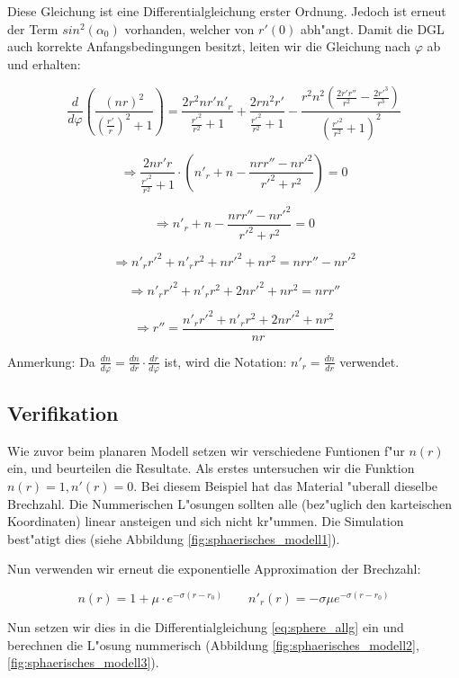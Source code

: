 \begin{refsection}
Diese Gleichung ist eine Differentialgleichung erster Ordnung. 
Jedoch ist erneut der Term $sin^2(\alpha_0)$ vorhanden, welcher von $r'(0)$ abh"angt. 
Damit die DGL auch korrekte Anfangsbedingungen besitzt, leiten wir die Gleichung nach $\varphi$ ab und erhalten:

$$\frac{d}{d\varphi}\left(\frac{(n r)^2}{\left(\frac{r'}{r}\right)^2 + 1}\right) =  \frac{2 r^2 n r' n'_r}{\frac{r'^2}{r^2}+1}+\frac{2 r n^2 r'}{\frac{r'^2}{r^2}+1}-\frac{r^2 n^2 \left(\frac{2 r' r''}{r^2}-\frac{2 r'^3}{r^3}\right)}{\left(\frac{r'^2}{r^2}+1\right)^2}$$

$$\Rightarrow \frac{2n r' r}{\frac{r'^2}{r^2}+1} \cdot \left( n'_r + n - \frac{n r r'' - n r'^2}{r'^2 + r^2} \right) = 0$$

\begin{equation} \label{eq:sphere_origin}
\Rightarrow n'_r + n - \frac{n r r'' - n r'^2}{r'^2 + r^2} = 0
\end{equation}

$$\Rightarrow n'_r r'^2  + n'_r r^2 + n r'^2 + nr^2 = n r r'' - n r'^2$$

$$\Rightarrow n'_r r'^2 + n'_r r^2 + 2 n r'^2 + n r^2 = n r r''$$

\begin{equation} \label{eq:sphere_allg}
\Rightarrow r'' = \frac{n'_r r'^2 + n'_r r^2 + 2 n r'^2 + n r^2}{n r}
\end{equation}

Anmerkung: Da $\frac{dn}{d\varphi} = \frac{dn}{dr} \cdot \frac{dr}{d\varphi}$ ist, wird die Notation: $n'_r = \frac{dn}{dr}$ verwendet.

\subsection{Verifikation}
Wie zuvor beim planaren Modell setzen wir verschiedene Funtionen f"ur $n(r)$ ein, und beurteilen die Resultate. 
Als erstes untersuchen wir die Funktion $n(r) = 1, n'(r) = 0$. 
Bei diesem Beispiel hat das Material "uberall dieselbe Brechzahl.
Die Nummerischen L"osungen sollten alle (bez"uglich den karteischen Koordinaten) linear ansteigen und sich nicht kr"ummen. Die Simulation best"atigt dies (siehe Abbildung \ref{fig:sphaerisches_modell1}).

Nun verwenden wir erneut die exponentielle Approximation der Brechzahl: 

$$n(r) = 1 + \mu \cdot e^{-\sigma (r - r_0)} \qquad n'_r(r) = -\sigma \mu e^{-\sigma (r - r_0)}$$

Nun setzen wir dies in die Differentialgleichung \ref{eq:sphere_allg} ein und berechnen die L"osung nummerisch (Abbildung \ref{fig:sphaerisches_modell2}, \ref{fig:sphaerisches_modell3}). 


\end{refsection}
